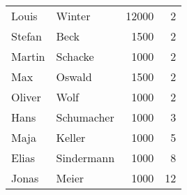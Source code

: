           \begin{center}
            \begin{small}
              \tablehead{}
              \begin{msoraclesql}
                \begin{supertabular}{llrr}
                  Louis & Winter & 12000 & 2 \\
                  Stefan & Beck & 1500 & 2 \\
                  Martin & Schacke & 1000 & 2 \\
                  Max & Oswald & 1500 & 2 \\
                  Oliver & Wolf & 1000 & 2 \\
                  Hans & Schumacher & 1000 & 3 \\
                  Maja & Keller & 1000 & 5 \\
                  Elias & Sindermann & 1000 & 8 \\
                  Jonas & Meier & 1000 & 12 \\
                \end{supertabular}
              \end{msoraclesql}
            \end{small}
          \end{center}
